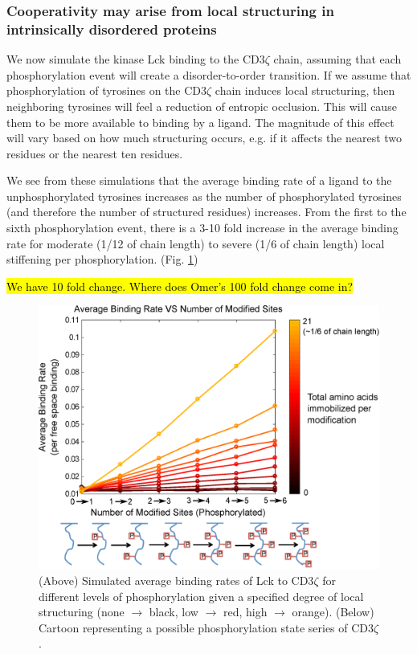 \documentclass[../../AdvancementSummary.tex]{subfiles}
\begin{document}
\subsubsection{Cooperativity may arise from local structuring in intrinsically disordered proteins}

We now simulate the kinase Lck binding to the CD3$\zeta$ chain, assuming that each phosphorylation event will create a disorder-to-order transition. If we assume that phosphorylation of tyrosines on the CD3$\zeta$ chain induces local structuring, then neighboring tyrosines will feel a reduction of entropic occlusion.  This will cause them to be more available to binding by a ligand. The magnitude of this effect will vary based on how much structuring occurs, e.g. if it affects the nearest two residues or the nearest ten residues. 

We see from these simulations that the average binding rate of a ligand to the unphosphorylated tyrosines increases as the number of phosphorylated tyrosines (and therefore the number of structured residues) increases. From the first to the sixth phosphorylation event, there is a 3-10 fold increase in the average binding rate for moderate (1/12 of chain length) to severe (1/6 of chain length) local stiffening per phosphorylation. (Fig. \ref{fig: StiffeningMemOnCoop})

\hl{We have 10 fold change.  Where does Omer's 100 fold change come in?}

\begin{figure}[H]
	\begin{center}
		\includegraphics[width=0.8\linewidth]{ResultsFigures/CD3ZetaStiffeningMembraneOn/AvgBindVSTotalPhosColorMapLabeled.eps}
		\caption{(Above) Simulated average binding rates of Lck to CD3$\zeta$ for different levels of phosphorylation given a specified degree of local structuring (none $\rightarrow$ black, low $\rightarrow$ red, high $\rightarrow$ orange). (Below) Cartoon representing a possible phosphorylation state series of CD3$\zeta$. \label{fig: StiffeningMemOnCoop}}
	\end{center}
\end{figure}
\end{document}
